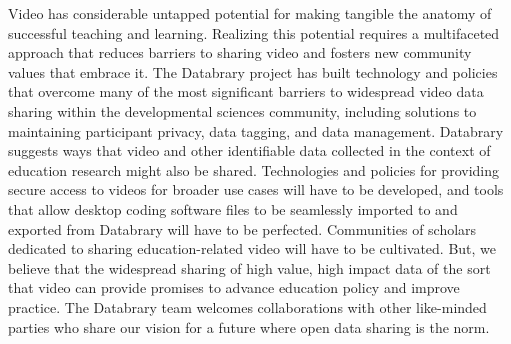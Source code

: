 \documentclass[letterpaper,man,apacite]{apa6}
\begin{document}
Video has considerable untapped potential for making tangible the anatomy of successful teaching and learning.
Realizing this potential requires a multifaceted approach that reduces barriers to sharing video and fosters new community values that embrace it.
The Databrary project has built technology and policies that overcome many of the most significant barriers to widespread video data sharing within the developmental sciences community, including solutions to maintaining participant privacy, data tagging, and data management. 
Databrary suggests ways that video and other identifiable data collected in the context of education research might also be shared.
Technologies and policies for providing secure access to videos for broader use cases will have to be developed, and tools that allow desktop coding software files to be seamlessly imported to and exported from Databrary will have to be perfected.
Communities of scholars dedicated to sharing education-related video will have to be cultivated.
But, we believe that the widespread sharing of high value, high impact data of the sort that video can provide promises to advance education policy and improve practice.
The Databrary team welcomes collaborations with other like-minded parties who share our vision \cite{Adolph2012} for a future where open data sharing is the norm.


\end{document}
